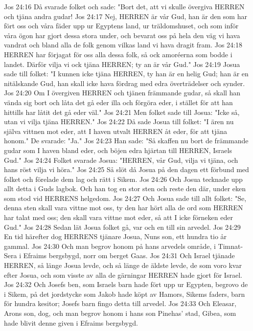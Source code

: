 Jos 24:16  Då svarade folket och sade: "Bort det, att vi skulle övergiva HERREN och tjäna andra gudar!
Jos 24:17  Nej, HERREN är vår Gud, han är den som har fört oss och våra fäder upp ur Egyptens land, ur träldomshuset, och som inför våra ögon har gjort dessa stora under, och bevarat oss på hela den väg vi hava vandrat och bland alla de folk genom vilkas land vi hava dragit fram.
Jos 24:18  HERREN har förjagat för oss alla dessa folk, så ock amoréerna som bodde i landet. Därför vilja vi ock tjäna HERREN; ty an är vår Gud."
Jos 24:19  Josua sade till folket: "I kunnen icke tjäna HERREN, ty han är en helig Gud; han är en nitälskande Gud, han skall icke hava fördrag med edra överträdelser och synder.
Jos 24:20  Om I övergiven HERREN och tjänen främmande gudar, så skall han vända sig bort och låta det gå eder illa och förgöra eder, i stället för att han hittills har låtit det gå eder väl."
Jos 24:21  Men folket sade till Josua: "Icke så, utan vi vilja tjäna HERREN."
Jos 24:22  Då sade Josua till folket: "I ären nu själva vittnen mot eder, att I haven utvalt HERREN åt eder, för att tjäna honom." De svarade: "Ja."
Jos 24:23  Han sade: "Så skaffen nu bort de främmande gudar som I haven bland eder, och böjen edra hjärtan till HERREN, Israels Gud."
Jos 24:24  Folket svarade Josua: "HERREN, vår Gud, vilja vi tjäna, och hans röst vilja vi höra."
Jos 24:25  Så slöt då Josua på den dagen ett förbund med folket och förelade dem lag och rätt i Sikem.
Jos 24:26  Och Josua tecknade upp allt detta i Guds lagbok. Och han tog en stor sten och reste den där, under eken som stod vid HERRENS helgedom.
Jos 24:27  Och Josua sade till allt folket: "Se, denna sten skall vara vittne mot oss, ty den har hört alla de ord som HERREN har talat med oss; den skall vara vittne mot eder, så att I icke förneken eder Gud."
Jos 24:28  Sedan lät Josua folket gå, var och en till sin arvedel.
Jos 24:29  En tid härefter dog HERRENS tjänare Josua, Nuns son, ett hundra tio år gammal.
Jos 24:30  Och man begrov honom på hans arvedels område, i Timnat-Sera i Efraims bergsbygd, norr om berget Gaas.
Jos 24:31  Och Israel tjänade HERREN, så länge Josua levde, och så länge de äldste levde, de som voro kvar efter Josua, och som visste av alla de gärningar HERREN hade gjort för Israel.
Jos 24:32  Och Josefs ben, som Israels barn hade fört upp ur Egypten, begrovo de i Sikem, på det jordstycke som Jakob hade köpt av Hamors, Sikems faders, barn för hundra kesitor; Josefs barn fingo detta till arvedel.
Jos 24:33  Och Eleasar, Arons son, dog, och man begrov honom i hans son Pinehas' stad, Gibea, som hade blivit denne given i Efraims bergsbygd.


